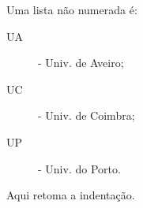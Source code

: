 Uma lista não numerada é:
\begin{description}
 \item[UA] - Univ. de Aveiro;
 \item[UC] - Univ. de Coimbra;
 \item[UP] - Univ. do Porto.
\end{description}
Aqui retoma a indentação.
